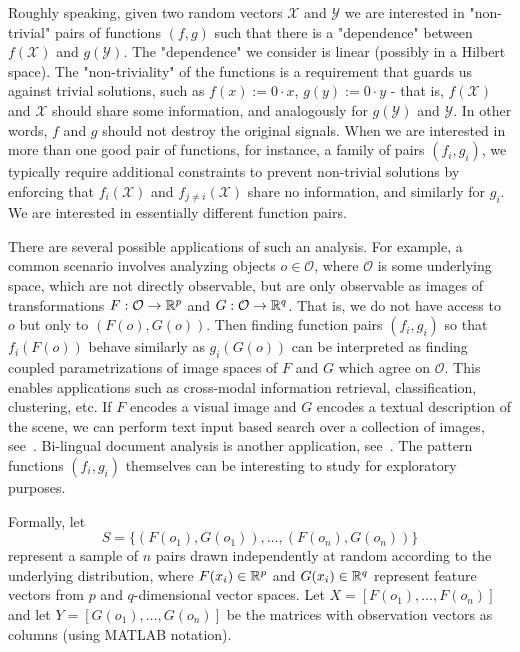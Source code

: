 Roughly speaking, given two random vectors $\mathcal{X}$ and $\mathcal{Y}$ we are interested in "non-trivial" pairs of functions $(f,g)$ such that there is a "dependence" between $f(\mathcal{X})$ and $g(\mathcal{Y})$. The "dependence" we consider is linear (possibly in a Hilbert space). The "non-triviality" of the functions is a requirement that guards us against trivial solutions, such as $f(x) := 0 \cdot x$, $g(y) := 0 \cdot y$ - that is, $f(\mathcal{X})$ and $\mathcal{X}$ should share some information, and analogously for $g(\mathcal{Y})$ and $\mathcal{Y}$. In other words, $f$ and $g$ should not destroy the original signals. When we are interested in more than one good pair of functions, for instance, a family of pairs $(f_i,g_i)$, we typically require additional constraints to prevent non-trivial solutions by enforcing that $f_i\left(\mathcal{X}\right)$ and $f_{j \neq i}\left(\mathcal{X}\right)$ share no information, and similarly for $g_i$. We are interested in essentially different function pairs.

There are several possible applications of such an analysis. For example, a common scenario involves analyzing objects $o \in \mathcal{O}$, where $\mathcal{O}$ is some underlying space, which are not directly observable, but are only observable as images of transformations $F: \mathcal{O} \rightarrow \mathbb{R}^p$ and $G: \mathcal{O} \rightarrow \mathbb{R}^q$. That is, we do not have access to $o$ but only to $\left(F(o), G(o)\right)$. Then finding function pairs $(f_i, g_i)$ so that $f_i(F(o))$ behave similarly as $g_i(G(o))$ can be interpreted as finding coupled parametrizations of image spaces of $F$ and $G$ which agree on $\mathcal{O}$. This enables applications such as cross-modal information retrieval, classification, clustering, etc. If $F$ encodes a visual image and $G$ encodes a textual description of the scene, we can perform text input based search over a collection of images, see~\cite{HardoonCCA}. Bi-lingual document analysis is another application, see~\cite{mrpqr}. The pattern functions $(f_i, g_i)$ themselves can be interesting to study for exploratory purposes.

Formally, let
$$ S = \{ \left( F(o_1), G(o_1) \right), \ldots, \left( F(o_n), G(o_n) \right) \} $$
represent a sample of $n$ pairs drawn independently at random according to the underlying distribution, where $F(x_i) \in \mathbb{R}^p$ and $G(x_i) \in \mathbb{R}^q$ represent feature vectors from $p$ and $q$-dimensional vector spaces. Let $X=[F(o_1), \ldots, F(o_n)]$ and let $Y=[G(o_1), \ldots ,G(o_n)]$ be the matrices with observation vectors as columns (using MATLAB notation).

